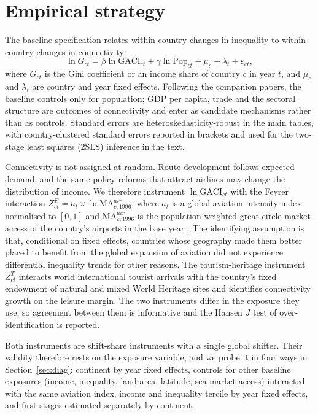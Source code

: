 \documentclass[12pt]{article}
\begin{document}
\section{Empirical strategy}
\label{sec:strategy}
The baseline specification relates within-country changes in inequality to within-country changes in connectivity:
\begin{equation}
\ln G_{ct} = \beta \ln \mathrm{GACI}_{ct} + \gamma \ln \mathrm{Pop}_{ct} + \mu_c + \lambda_t + \varepsilon_{ct},
\label{eq:base}
\end{equation}
where $G_{ct}$ is the Gini coefficient or an income share of country $c$ in year $t$, and $\mu_c$ and $\lambda_t$ are country and year fixed effects. Following the companion papers, the baseline controls only for population; GDP per capita, trade and the sectoral structure are outcomes of connectivity and enter as candidate mechanisms rather than as controls. Standard errors are heteroskedasticity-robust in the main tables, with country-clustered standard errors reported in brackets and used for the two-stage least squares (2SLS) inference in the text.

Connectivity is not assigned at random. Route development follows expected demand, and the same policy reforms that attract airlines may change the distribution of income. We therefore instrument $\ln\mathrm{GACI}_{ct}$ with the Feyrer interaction $Z^{F}_{ct} = a_t \times \ln\mathrm{MA}^{air}_{c,1996}$, where $a_t$ is a global aviation-intensity index normalised to $[0,1]$ and $\mathrm{MA}^{air}_{c,1996}$ is the population-weighted great-circle market access of the country's airports in the base year \citep{Feyrer_2019}. The identifying assumption is that, conditional on fixed effects, countries whose geography made them better placed to benefit from the global expansion of aviation did not experience differential inequality trends for other reasons. The tourism-heritage instrument $Z^{T}_{ct}$ interacts world international tourist arrivals with the country's fixed endowment of natural and mixed World Heritage sites and identifies connectivity growth on the leisure margin. The two instruments differ in the exposure they use, so agreement between them is informative and the Hansen $J$ test of over-identification is reported.

Both instruments are shift-share instruments with a single global shifter. Their validity therefore rests on the exposure variable, and we probe it in four ways in Section~\ref{sec:diag}: continent by year fixed effects, controls for other baseline exposures (income, inequality, land area, latitude, sea market access) interacted with the same aviation index, income and inequality tercile by year fixed effects, and first stages estimated separately by continent.
\end{document}
